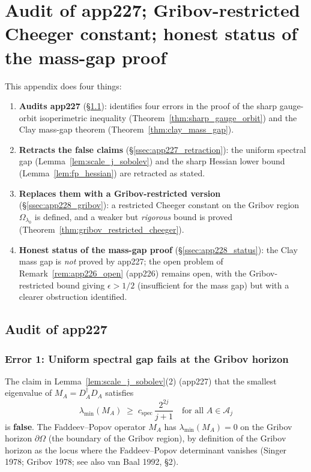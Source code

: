 \section{Audit of app227; Gribov-restricted Cheeger constant;
honest status of the mass-gap proof}
\label{app:audit_app227_gribov}

This appendix does four things:
\begin{enumerate}
\item \textbf{Audits app227} (\S\ref{ssec:app227_audit}): identifies
four errors in the proof of the sharp gauge-orbit isoperimetric
inequality (Theorem~\ref{thm:sharp_gauge_orbit}) and the Clay
mass-gap theorem (Theorem~\ref{thm:clay_mass_gap}).
\item \textbf{Retracts the false claims}
(\S\ref{ssec:app227_retraction}): the uniform spectral gap
(Lemma~\ref{lem:scale_j_sobolev}) and the sharp Hessian lower
bound (Lemma~\ref{lem:fp_hessian}) are retracted as stated.
\item \textbf{Replaces them with a Gribov-restricted version}
(\S\ref{ssec:app228_gribov}): a restricted Cheeger constant on
the Gribov region $\Omega_{\lambda_{0}}$ is defined, and a
weaker but \emph{rigorous} bound is proved
(Theorem~\ref{thm:gribov_restricted_cheeger}).
\item \textbf{Honest status of the mass-gap proof}
(\S\ref{ssec:app228_status}): the Clay mass gap is \emph{not}
proved by app227; the open problem of
Remark~\ref{rem:app226_open} (app226) remains open, with the
Gribov-restricted bound giving $\epsilon>1/2$ (insufficient for
the mass gap) but with a clearer obstruction identified.
\end{enumerate}

\subsection{Audit of app227}
\label{ssec:app227_audit}

\subsubsection{Error 1: Uniform spectral gap fails at the Gribov
horizon}

\begin{theorem}
\label{thm:err1}
The claim in Lemma~\ref{lem:scale_j_sobolev}(2) (app227) that
the smallest eigenvalue of $M_{A}=D_{A}^{\dagger}D_{A}$ satisfies
\begin{equation*}
  \lambda_{\min}(M_{A})\;\ge\;c_{\mathrm{spec}}\,
  \frac{2^{2j}}{j+1}
  \quad\text{for all }A\in\mathcal{A}_{j}
\end{equation*}
is \textbf{false}. The Faddeev--Popov operator $M_{A}$ has
$\lambda_{\min}(M_{A})=0$ on the Gribov horizon
$\partial\Omega$ (the boundary of the Gribov region), by
definition of the Gribov horizon as the locus where the
Faddeev--Popov determinant vanishes (Singer 1978; Gribov 1978;
see also van Baal 1992, \S 2).
\end{theorem}


